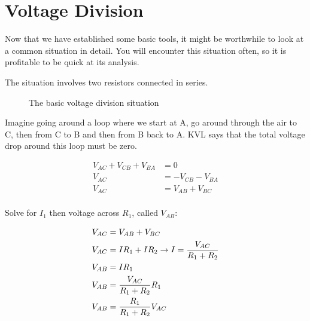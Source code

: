 \section{Voltage Division}
Now that we have established some basic tools, it might be worthwhile to look at a common situation in detail. You will encounter this situation often, so it is profitable to be quick at its analysis.
\par
The situation involves two resistors connected in series.
\par
\begin{figure}[H]
\begin{center}
\caption{The basic voltage division situation}
\end{center}
\end{figure}

Imagine going around a loop where we start at A, go around through the air to C, then from C to B and then from B back to A. KVL says that the total voltage drop around this loop must be zero.
\par
\begin{align*}
V_{AC} + V_{CB}+V_{BA}&=0\\
V_{AC} &=-V_{CB}-V_{BA}\\
V_{AC} &= V_{AB}+V_{BC} \tag{Individual Voltages Sum to Total Voltage}\\
\end{align*}

Solve for $I_1$ then voltage across $R_1$, called $V_{AB}$:

\begin{align}
V_{AC} &= V_{AB}+V_{BC}\notag\\
V_{AC} &= IR_1+IR_2 \rightarrow I=\frac{V_{AC}}{R_1+R_2}\notag\\
V_{AB}&=IR_1\notag\\
V_{AB}&=\frac{V_{AC}}{R_1+R_2}R_1\notag\\
V_{AB}&=\frac{R_1}{R_1+R_2}V_{AC}
\end{align}

